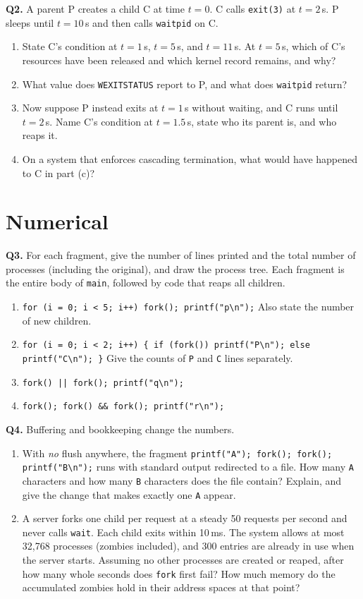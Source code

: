 \documentclass[11pt]{article}
\begin{document}
\textbf{Q2.} A parent P creates a child C at time $t = 0$. C calls \texttt{exit(3)} at $t = 2$\,s. P sleeps until $t = 10$\,s and then calls \texttt{waitpid} on C.
\begin{enumerate}
  \item[(a)] State C's condition at $t = 1$\,s, $t = 5$\,s, and $t = 11$\,s. At $t = 5$\,s, which of C's resources have been released and which kernel record remains, and why?
  \item[(b)] What value does \texttt{WEXITSTATUS} report to P, and what does \texttt{waitpid} return?
  \item[(c)] Now suppose P instead exits at $t = 1$\,s without waiting, and C runs until $t = 2$\,s. Name C's condition at $t = 1.5$\,s, state who its parent is, and who reaps it.
  \item[(d)] On a system that enforces cascading termination, what would have happened to C in part (c)?
\end{enumerate}

\section{Numerical}

\textbf{Q3.} For each fragment, give the number of lines printed and the total number of processes (including the original), and draw the process tree. Each fragment is the entire body of \texttt{main}, followed by code that reaps all children.
\begin{enumerate}
  \item[(a)] \texttt{for (i = 0; i < 5; i++) fork(); printf("p\textbackslash n");} \quad Also state the number of new children.
  \item[(b)] \texttt{for (i = 0; i < 2; i++) \{ if (fork()) printf("P\textbackslash n"); else printf("C\textbackslash n"); \}} \quad Give the counts of \texttt{P} and \texttt{C} lines separately.
  \item[(c)] \texttt{fork() || fork(); printf("q\textbackslash n");}
  \item[(d)] \texttt{fork(); fork() \&\& fork(); printf("r\textbackslash n");}
\end{enumerate}

\textbf{Q4.} Buffering and bookkeeping change the numbers.
\begin{enumerate}
  \item[(a)] With \emph{no} flush anywhere, the fragment \texttt{printf("A"); fork(); fork(); printf("B\textbackslash n");} runs with standard output redirected to a file. How many \texttt{A} characters and how many \texttt{B} characters does the file contain? Explain, and give the change that makes exactly one \texttt{A} appear.
  \item[(b)] A server forks one child per request at a steady 50 requests per second and never calls \texttt{wait}. Each child exits within 10\,ms. The system allows at most 32{,}768 processes (zombies included), and 300 entries are already in use when the server starts. Assuming no other processes are created or reaped, after how many whole seconds does \texttt{fork} first fail? How much memory do the accumulated zombies hold in their address spaces at that point?
\end{enumerate}
\end{document}
